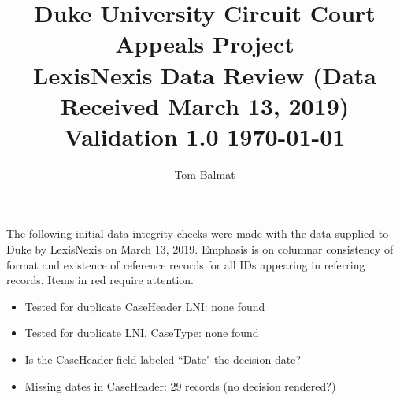 \documentclass[10pt, letterpaper]{article}
\title{\large Duke University Circuit Court Appeals Project\\[10pt]
       LexisNexis Data Review (Data Received March 13, 2019)\\[10pt]
       Validation 1.0\hspace{10pt} \today\\[-6pt]}
\author{Tom Balmat}
\date{}
\begin{document}
    
\begin{spacing}{1.0}
    
\maketitle

The following initial data integrity checks were made with the data supplied to Duke by LexisNexis on March 13, 2019.  Emphasis is on columnar consistency of format and existence of reference records for all IDs appearing in referring records.  Items in {\color{red}red} require attention.

\begin{itemize}
    
    \item Tested for duplicate CaseHeader LNI:  none found
    
    \item Tested for duplicate LNI, CaseType:  none found
    
    \item {\color{red}Is the CaseHeader field labeled ``Date" the decision date?}
    
    \item {\color{red} Missing dates in CaseHeader}:  29 records (no decision rendered?)
    

\end{itemize}
\end{spacing}
\end{document}
